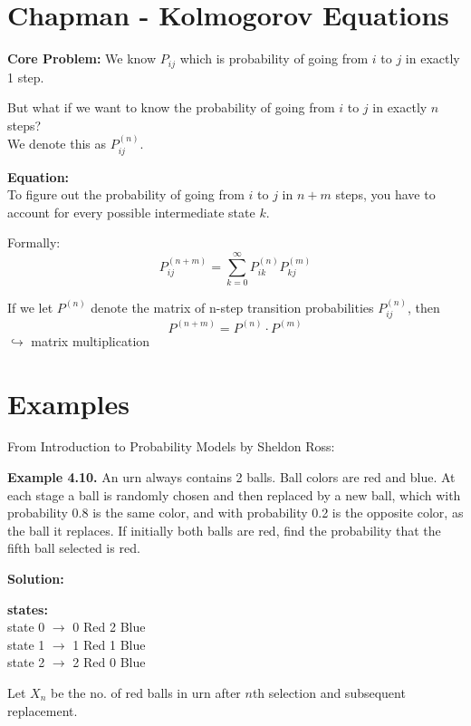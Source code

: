 \vspace{0.5cm}

\section{\textcolor{primary}{Chapman - Kolmogorov Equations}}
\textbf{\textcolor{secondary}{Core Problem:}} We know $P_{ij}$ which is probability of going from $i$ to $j$ in exactly 1 step.

But what if we want to know the probability of going from $i$ to $j$ in exactly $n$ steps?\\
We denote this as $P_{ij}^{(n)}$.

\textbf{\textcolor{secondary}{Equation:}} \\
To figure out the probability of going from $i$ to $j$ in $n+m$ steps, you have to account for every possible intermediate state $k$.

Formally:
\[ P_{ij}^{(n+m)} = \sum_{k=0}^{\infty} P_{ik}^{(n)} P_{kj}^{(m)} \]

If we let $P^{(n)}$ denote the matrix of n-step transition probabilities $P_{ij}^{(n)}$, then
\[ P^{(n+m)} = P^{(n)} \cdot P^{(m)} \]
$\hookrightarrow$ matrix multiplication

\section{\textcolor{primary}{Examples}}
From Introduction to Probability Models by Sheldon Ross:

\textbf{Example 4.10.} An urn always contains 2 balls. Ball colors are red and blue. At each
stage a ball is randomly chosen and then replaced by a new ball, which with probability 0.8 is the same color, and with probability 0.2 is the opposite color, as the ball it
replaces. If initially both balls are red, find the probability that the fifth ball selected is
red.

\textbf{Solution:}

\vspace{0.2cm}
\begin{minipage}[t]{0.5\textwidth}
\textbf{states:} \\
state 0 $\rightarrow$ 0 Red 2 Blue \\
state 1 $\rightarrow$ 1 Red 1 Blue \\
state 2 $\rightarrow$ 2 Red 0 Blue
\end{minipage}
\begin{minipage}[t]{0.45\textwidth}
Let $X_n$ be the no. of red balls in urn after $n$th selection and subsequent replacement.
\end{minipage}

